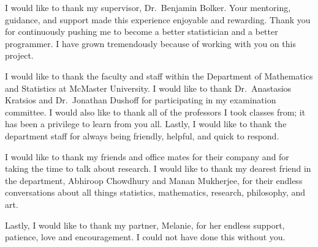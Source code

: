 \documentclass[
11pt, %
oneside, %
english, %
singlespacing, %
]{macthesis} %
\def\blankpage{%
      \clearpage%
      \thispagestyle{empty}%
      \addtocounter{page}{-1}%
      \null%
      \clearpage}
\begin{document}
  \begin{acknowledgements}
  \addchaptertocentry{\acknowledgementname} %
    I would like to thank my supervisor, Dr.~Benjamin Bolker. Your mentoring, guidance, and support made this experience enjoyable and rewarding. Thank you for continuously pushing me to become a better statistician and a better programmer. I have grown tremendously because of working with you on this project.

    I would like to thank the faculty and staff within the Department of Mathematics and Statistics at McMaster University. I would like to thank Dr.~Anastasios Kratsios and Dr.~Jonathan Dushoff for participating in my examination committee. I would also like to thank all of the professors I took classes from; it has been a privilege to learn from you all. Lastly, I would like to thank the department staff for always being friendly, helpful, and quick to respond.

    I would like to thank my friends and office mates for their company and for taking the time to talk about research. I would like to thank my dearest friend in the department, Abhiroop Chowdhury and Manan Mukherjee, for their endless conversations about all things statistics, mathematics, research, philosophy, and art.

    Lastly, I would like to thank my partner, Melanie, for her endless support, patience, love and encouragement. I could not have done this without you.
  \end{acknowledgements}
\blankpage
\clearpage


\tableofcontents %

\listoffigures %

\listoftables %

\end{document}
